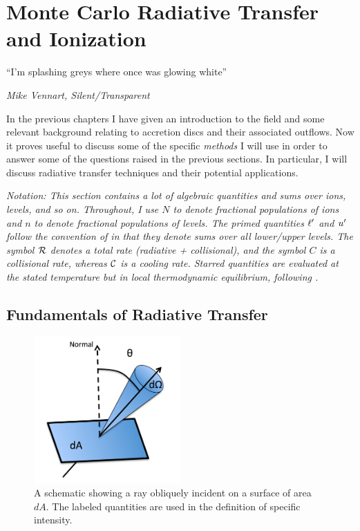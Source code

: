 \chapter{Monte Carlo Radiative Transfer and Ionization}

\epigraph{``I'm splashing greys where once was glowing white''}{{\sl Mike Vennart, Silent/Transparent}}

In the previous chapters I have given an introduction to the field and 
some relevant background relating to accretion 
discs and their associated outflows. Now it proves useful
to discuss some of the specific {\em methods} I will use
in order to answer some of the questions raised in the previous sections.
In particular, I will discuss radiative transfer techniques and 
their potential applications.

{\sl Notation: This section contains a lot of algebraic quantities and sums over
ions, levels, and so on. Throughout, I use $N$ to denote fractional
populations of ions and $n$ to denote fractional populations of levels. 
The primed quantities ${\ell^\prime}$ and ${u^\prime}$ follow the convention of 
\cite{lucy2002} in that they denote sums over all lower/upper levels.
The symbol ${\cal R}$ denotes a total rate (radiative + collisional), 
and the symbol $C$ is a collisional rate, whereas ${\cal C}$ is a cooling 
rate. Starred quantities are evaluated at the stated temperature but 
in local thermodynamic equilibrium, following \cite{mihalas}. 
}



\section{Fundamentals of Radiative Transfer}

\begin{figure}
\centering
\includegraphics[width=0.5\textwidth]{figures/03-radtrans/rays_schematic.png}
\caption
{
A schematic showing a ray obliquely incident on a surface of area $dA$.
The labeled quantities are used in the definition of specific intensity.
} 
\label{fig:ray}
\end{figure}


